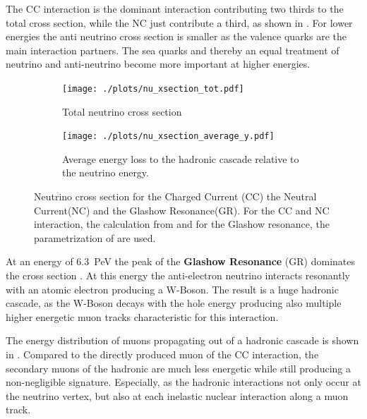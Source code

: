 The CC interaction is the dominant interaction contributing two thirds to the total cross section, while the NC just contribute a third, as shown in .
For lower energies the anti neutrino cross section is smaller as the valence quarks are the main interaction partners.
The sea quarks and thereby an equal treatment of neutrino and anti-neutrino become more important at higher energies.

\begin{figure}
    \centering
    \begin{subfigure}[t]{0.47\textwidth}
        \centering
        \texttt{[image: ./plots/nu\_xsection\_tot.pdf]}
        \caption{Total neutrino cross section}
        \label{fig:nu_xsection_tot}
    \end{subfigure}
    \hfill
    \begin{subfigure}[t]{0.47\textwidth}
        \centering
        \texttt{[image: ./plots/nu\_xsection\_average\_y.pdf]}
        \caption{Average energy loss to the hadronic cascade relative to the neutrino energy.}
        \label{fig:nu_xsection_y}
    \end{subfigure}
    \caption{Neutrino cross section for the Charged Current (CC) the Neutral Current(NC) and the Glashow Resonance(GR). For the CC and NC interaction, the calculation from \cite{CSMS11NuXsection} and for the Glashow resonance, the parametrization of \cite{Barger14} are used.}
    \label{fig:nu_xsection}
\end{figure}

At an energy of \SI{6.3}{PeV} the peak of the \textbf{Glashow Resonance} (GR) dominates the cross section \cite{Glashow60}.
At this energy the anti-electron neutrino interacts resonantly with an atomic electron producing a W-Boson.
The result is a huge hadronic cascade, as the W-Boson decays with the hole energy producing also multiple higher energetic muon tracks characteristic for this interaction.

The energy distribution of muons propagating out of a hadronic cascade is shown in .
Compared to the directly produced muon of the CC interaction, the secondary muons of the hadronic are much less energetic while still producing a non-negligible signature.
Especially, as the hadronic interactions not only occur at the neutrino vertex, but also at each inelastic nuclear interaction along a muon track.

